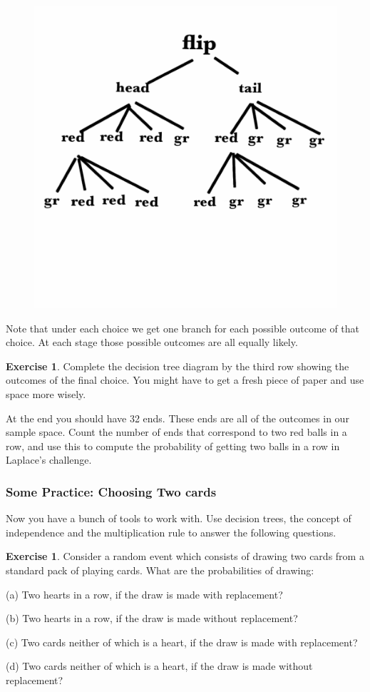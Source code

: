 \documentclass[12pt,letterpaper]{article}
\theoremstyle{definition}
\newtheorem{exercise}[question]{Exercise}
\begin{document}
\begin{figure}[h]
\centering
    \includegraphics[width=.5\textwidth]{dec-tree.png}
\end{figure}

Note that under each choice we get one branch for each possible outcome of that choice.
At each stage those possible outcomes are all equally likely.

\begin{exercise}
Complete the decision tree diagram by the third row showing the outcomes of the final choice. 
You might have to get a fresh piece of paper and use space more wisely.

At the end you should have 32 ends.
These ends are all of the outcomes in our sample space.
Count the number of ends that correspond to two red balls in a row, and use this to compute the probability of getting two balls in a row in Laplace's challenge.
\end{exercise}

\subsubsection*{Some Practice: Choosing Two cards}

Now you have a bunch of tools to work with.
Use decision trees, the concept of independence and the multiplication rule to answer the following questions.


\begin{exercise}
Consider a random event which consists of drawing two cards from a standard pack of playing cards. What are the probabilities of drawing:
\begin{compactdesc}
\item[(a)] Two hearts in a row, if the draw is made with replacement?
\item[(b)] Two hearts in a row, if the draw is made without replacement?
\item[(c)] Two cards neither of which is a heart, if the draw is made with replacement?
\item[(d)] Two cards neither of which is a heart, if the draw is made without replacement?
\end{compactdesc}
\end{exercise}
\end{document}
